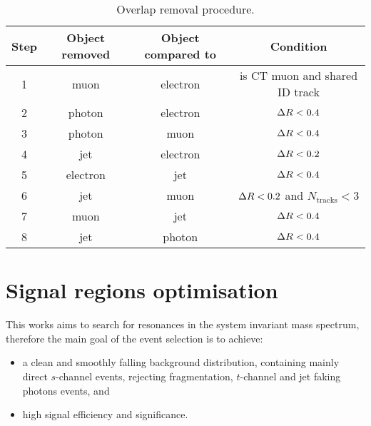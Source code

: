 \begin{table}[ht!]
    \centering
    \caption{Overlap removal procedure.}
    \begin{tabular}{cccc}
        \toprule
        Step    & Object removed    & Object compared to & Condition\\
        \midrule
        1       & muon              & electron              & is \ac{CT} muon and shared \ac{ID} track  \\
        2       & photon            & electron              & \(\Delta R < 0.4\)                         \\
        3       & photon            & muon                  & \(\Delta R < 0.4\)                         \\
        4       & jet               & electron              & \(\Delta R < 0.2\)                         \\
        5       & electron          & jet                   & \(\Delta R < 0.4\)                         \\
        6       & jet               & muon                  & \(\Delta R < 0.2\) and \(N_{\text{tracks}} < 3\) \\
        7       & muon              & jet                   & \(\Delta R < 0.4\)\\
        8       & jet               & photon                & \(\Delta R < 0.4\)\\
        \bottomrule
    \end{tabular}
    \label{tab:evt_selection:presel:or}
\end{table}










\section{Signal regions optimisation}
\label{sec:evt_selection:sr_opt}


This works aims to search for resonances in the \gammajet system invariant mass spectrum, therefore the main goal of the event selection is to achieve:
\begin{itemize}
    \item a clean and smoothly falling background distribution, containing mainly direct \(s\)-channel \gammajet events, rejecting fragmentation, \(t\)-channel and jet faking photons events, and
    \item high signal efficiency and significance.
\end{itemize}


